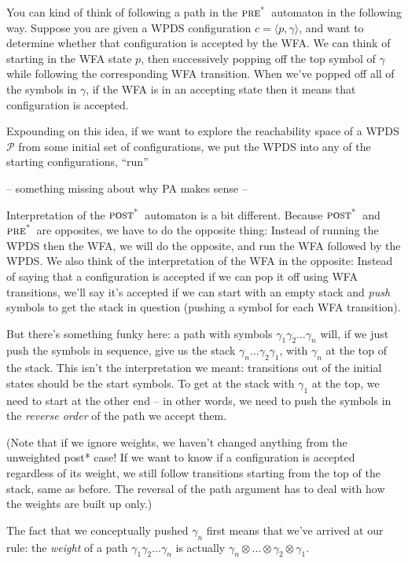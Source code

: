 \documentclass{article}
\newcommand{\Config}[2]{\ensuremath{\langle #1, #2 \rangle}}
\newcommand{\extend}{\otimes}
\newcommand{\poststar}{\ensuremath{\textsc{post}^\textsc{*}}}
\newcommand{\prestar}{\ensuremath{\textsc{pre}^\textsc{*}}}
\begin{document}
You can kind of think of following a path in the \prestar\ automaton
in the following way. Suppose you are given a WPDS configuration
$c=\Config{p}{\gamma}$, and want to determine whether that
configuration is accepted by the WFA. We can think of starting in the
WFA state $p$, then successively popping off the top symbol of
$\gamma$ while following the corresponding WFA transition. When we've
popped off all of the symbols in $\gamma$, if the WFA is in an
accepting state then it means that configuration is accepted.

Expounding on this idea, if we want to explore the reachability space
of a WPDS $\mathcal{P}$ from some initial set of configurations, we
put the WPDS into any of the starting configurations, ``run'' 

-- something missing about why PA makes sense --

Interpretation of the \poststar\ automaton is a bit different. Because
\poststar\ and \prestar\ are opposites, we have to do the opposite thing:
Instead of running the WPDS then the WFA, we will do the opposite, and
run the WFA followed by the WPDS. We also think of the interpretation
of the WFA in the opposite: Instead of saying that a configuration is
accepted if we can pop it off using WFA transitions, we'll say it's
accepted if we can start with an empty stack and \emph{push} symbols
to get the stack in question (pushing a symbol for each WFA
transition).

But there's something funky here: a path with symbols $\gamma_1
\gamma_2 \dots \gamma_n$ will, if we just push the symbols in
sequence, give us the stack $\gamma_n \dots \gamma_2 \gamma_1$, with
$\gamma_n$ at the top of the stack. This isn't the interpretation we
meant: transitions out of the initial states should be the start
symbols. To get at the stack with $\gamma_1$ at the top, we need to
start at the other end -- in other words, we need to push the symbols
in the \emph{reverse order} of the path we accept them.

(Note that if we ignore weights, we haven't changed anything from the
unweighted post* case! If we want to know if a configuration is
accepted regardless of its weight\footnotemark, we still follow
transitions starting from the top of the stack, same as before. The
reversal of the path argument has to deal with how the weights are
built up only.)

The fact that we conceptually pushed $\gamma_n$ first means that we've
arrived at our rule: the \emph{weight} of a path $\gamma_1 \gamma_2
\dots \gamma_n$ is actually $\gamma_n \extend \dots \extend \gamma_2
\extend \gamma_1$.
\end{document}
